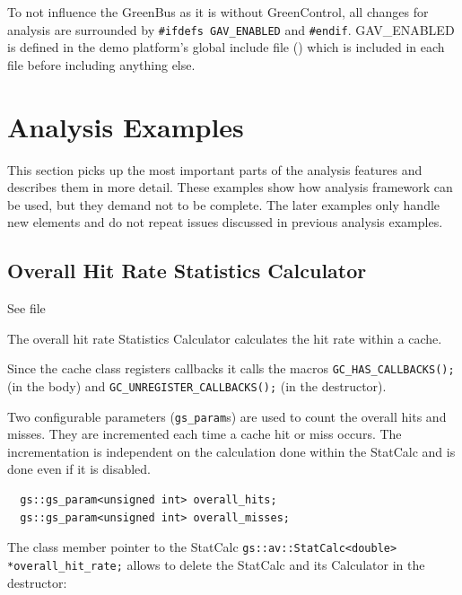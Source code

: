 To not influence the GreenBus as it is without GreenControl, all changes for analysis are surrounded by \lstinline[language=TeX]|#ifdefs GAV_ENABLED| and \lstinline[language=TeX]|#endif|. {\sffamily GAV\_ENABLED} is defined in the demo platform's global include file () which is included in each file before including anything else. 


\section{Analysis Examples}

This section picks up the most important parts of the analysis features and describes them in more detail. These examples show how analysis framework can be used, but they demand not to be complete. The later examples only handle new elements and do not repeat issues discussed in previous analysis examples.


\subsection{Overall Hit Rate Statistics Calculator}

See file 

The overall hit rate Statistics Calculator calculates the hit rate within a cache.

Since the cache class registers callbacks it calls the macros \lstinline|GC_HAS_CALLBACKS();| (in the body) and \lstinline|GC_UNREGISTER_CALLBACKS();| (in the destructor).

Two configurable parameters (\lstinline|gs_param|s) are used to count the overall hits and misses. They are incremented each time a cache hit or miss occurs. The incrementation is independent on the calculation done within the StatCalc and is done even if it is disabled.
\begin{lstlisting}
  gs::gs_param<unsigned int> overall_hits;
  gs::gs_param<unsigned int> overall_misses;
\end{lstlisting}

The class member pointer to the StatCalc \newline
\lstinline|gs::av::StatCalc<double> *overall_hit_rate;| \newline
allows to delete the StatCalc and its Calculator in the destructor:

